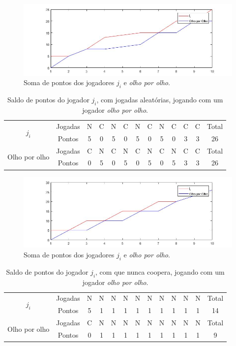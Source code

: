 \begin{figure}[H]
\centering
\includegraphics[width=14cm]{imagens/graf5.jpg}
\caption{Soma de pontos dos jogadores $j_i$ e \textit{olho por olho}.}
\label{fig5}
\end{figure}

\begin{table}[H]
\centering
\begin{tabular}{|c|c|c|c|c|c|c|c|c|c|c|c|c|}\hline
\multirow{2}{*}{$j_i$} & Jogadas & N & C & N & C & N & C & N & C &	C &	C & Total\\\cline{2-12}
 & Pontos & 5 & 0 & 5 & 0 & 5 & 0 & 5 & 0 & 3 & 3 & 26\\\hline\hline
\multirow{2}{*}{Olho por olho} & Jogadas & C & N & C & N & C & N & C & N &	C &	C & Total\\\cline{2-12}
 & Pontos & 0 & 5 & 0 & 5 & 0 & 5 & 0 & 5 & 3 & 3 & 26\\\hline
\end{tabular}
\caption{Saldo de pontos do jogador $j_i$, com jogadas aleatórias, jogando com um jogador \textit{olho por olho}.}
\label{tab6}
\end{table}

\begin{figure}[H]
\centering
\includegraphics[width=14cm]{imagens/graf6.jpg}
\caption{Soma de pontos dos jogadores $j_i$ e \textit{olho por olho}.}
\label{fig6}
\end{figure}

\begin{table}[H]
\centering
\begin{tabular}{|c|c|c|c|c|c|c|c|c|c|c|c|c|}\hline
\multirow{2}{*}{$j_i$} & Jogadas & N & N & N & N & N & N & N & N &	N &	N & Total\\\cline{2-12}
 & Pontos & 5 & 1 & 1 & 1 & 1 & 1 & 1 & 1 & 1 & 1 & 14\\\hline\hline
\multirow{2}{*}{Olho por olho} & Jogadas & C & N & N & N & N & N & N & N &	N &	N & Total\\\cline{2-12}
 & Pontos & 0 & 1 & 1 & 1 & 1 & 1 & 1 & 1 & 1 & 1 & 9\\\hline
\end{tabular}
\caption{Saldo de pontos do jogador $j_i$, com que nunca coopera, jogando com um jogador \textit{olho por olho}.}
\label{tab7}
\end{table}

